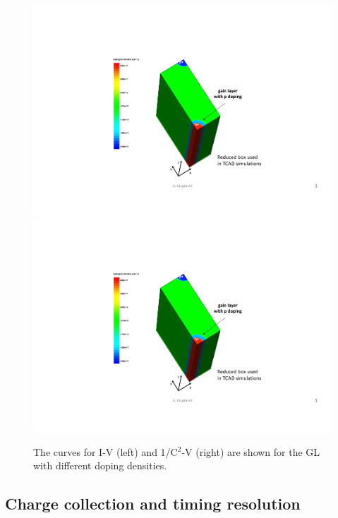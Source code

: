 \documentclass[aps,pt14,superscriptaddress,showpacs,floatfix,nofootinbib]{revtex4}
\begin{document}
\begin{figure}[hbtp]
\begin{center}
\includegraphics[page=3,width=0.35\textheight,keepaspectratio]{figures/IBL-3DwithGainLayer_20190610_toWeiming.pdf}
\includegraphics[page=4,width=0.35\textheight,keepaspectratio]{figures/IBL-3DwithGainLayer_20190610_toWeiming.pdf}
\caption{The curves for I-V (left) and 1/C$^2$-V (right) are shown for the GL with different doping 
densities.\label{fig:IV-C}}
\end{center}
\end{figure}

\subsection{Charge collection and timing resolution} 
\end{document}
